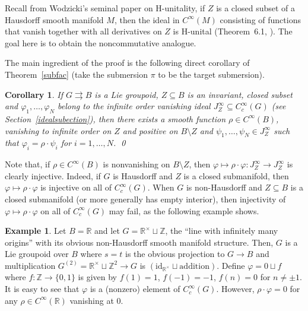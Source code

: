 \documentclass[12pt]{article}
\theoremstyle{plain}
\newtheorem{cor}[thm]{Corollary}
\theoremstyle{definition}
\newtheorem{ex}[thm]{Example}
\newcommand{\R}{\mathbb{R}}
\newcommand{\Z}{\mathbb{Z}}
\newcommand{\id}{\mathrm{id}}
\numberwithin{equation}{section}
\begin{document}
Recall from Wodzicki's seminal paper on H-unitality,  if $Z$ is a closed subset of a Hausdorff smooth manifold $M$, then the ideal in $C^\infty(M)$ consisting of functions that vanish together with all derivatives on $Z$ is H-unital (Theorem~6.1, \cite{Wodzicki}). The goal here is to obtain the noncommutative analogue.











The main ingredient of the proof is the following direct corollary of Theorem~\ref{subfac} (take the submersion $\pi$ to be the target submersion).

\begin{cor}\label{targetfac}
If $G \rightrightarrows B$ is  a Lie groupoid, $Z \subseteq B$ is an invariant, closed subset and   $\varphi_1,\ldots,\varphi_N$ belong to the infinite order vanishing ideal $J_Z^\infty \subseteq C_c^\infty(G)$ (see Section~\ref{idealsubection}), then there exists a smooth function $\rho \in C^\infty(B)$,  vanishing to infinite order on $Z$ and positive on $B\setminus Z$ and $\psi_1,\ldots,\psi_N \in J_Z^\infty$ such that $\varphi_i=\rho \cdot \psi_i$ for $i=1,\ldots,N$. \qed
\end{cor}

Note that, if $\rho \in C^\infty(B)$ is nonvanishing on $B\setminus Z$, then  $\varphi \mapsto \rho \cdot \varphi : J^\infty_Z \to J^\infty_Z$ is clearly injective. Indeed, if $G$ is Hausdorff and $Z$ is a closed submanifold, then $\varphi \mapsto \rho \cdot \varphi$ is injective on all of $C_c^\infty(G)$. When $G$ is non-Hausdorff and $Z\subseteq B$ is a closed submanifold (or more generally has empty interior), then injectivity of $\varphi \mapsto \rho\cdot\varphi$ on all of $C_c^\infty(G)$ may fail, as the following example shows.
\begin{ex}
Let $B= \R$ and let $G = \R^ \times \sqcup  \Z$, the ``line with infinitely many origins'' with its obvious non-Hausdorff smooth manifold structure. Then, $G$ is a Lie groupoid over $B$ where  $s=t$ is the obvious projection to $G \to B$ and multiplication $G^{(2)} = \R^\times \sqcup \Z^2 \to G$ is $(\id_{\R^\times} \sqcup \mathrm{addition})$.  Define $\varphi = 0 \sqcup f$ where $f : \Z \to \{0,1\}$ is given by $f(1)=1$, $f(-1)=-1$, $f(n)=0$ for $n \neq \pm 1$. It is easy to see that $\varphi$ is a (nonzero) element of $C_c^\infty(G)$. However, $\rho \cdot \varphi =0$ for any $\rho \in C^\infty(\R)$ vanishing at $0$.
\end{ex}
\end{document}
